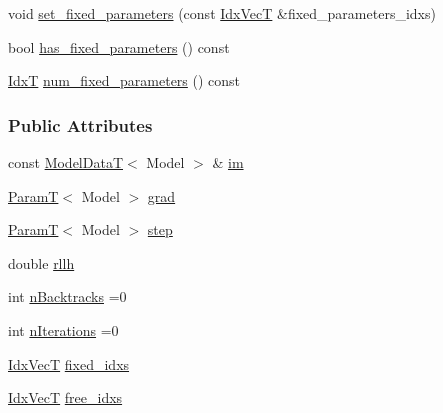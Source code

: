 \begin{DoxyCompactItemize}
void \hyperlink{classmappel_1_1estimator_1_1IterativeMaximizer_1_1MaximizerData_a0094ff8afeec02cd89b65c6e2e55adcb}{set\+\_\+fixed\+\_\+parameters} (const \hyperlink{namespacemappel_ac63743dcd42180127307cd0e4ecdd784}{Idx\+VecT} \&fixed\+\_\+parameters\+\_\+idxs)
\item 
bool \hyperlink{classmappel_1_1estimator_1_1IterativeMaximizer_1_1MaximizerData_a3c8ca53ca10c86795555b9e8da8c7be7}{has\+\_\+fixed\+\_\+parameters} () const 
\item 
\hyperlink{namespacemappel_ab17ec0f30b61ece292439d7ece81d3a8}{IdxT} \hyperlink{classmappel_1_1estimator_1_1IterativeMaximizer_1_1MaximizerData_a0b817c4ce7684bbf0aac25c2a7e55c63}{num\+\_\+fixed\+\_\+parameters} () const 
\end{DoxyCompactItemize}
\subsubsection*{Public Attributes}
\begin{DoxyCompactItemize}
\item 
const \hyperlink{namespacemappel_a97f050df953605381ae9c901c3b125f1}{Model\+DataT}$<$ Model $>$ \& \hyperlink{classmappel_1_1estimator_1_1IterativeMaximizer_1_1MaximizerData_a01a762941a06e7f6839817971674c354}{im}
\item 
\hyperlink{namespacemappel_a667925cb0d6c0e49f2f035cc5a9a6857}{ParamT}$<$ Model $>$ \hyperlink{classmappel_1_1estimator_1_1IterativeMaximizer_1_1MaximizerData_a7a71e71e379159ee30914e0539196c71}{grad}
\item 
\hyperlink{namespacemappel_a667925cb0d6c0e49f2f035cc5a9a6857}{ParamT}$<$ Model $>$ \hyperlink{classmappel_1_1estimator_1_1IterativeMaximizer_1_1MaximizerData_abca4cc72bc3cbf7326c5d4ad040e3821}{step}
\item 
double \hyperlink{classmappel_1_1estimator_1_1IterativeMaximizer_1_1MaximizerData_a8df6de6efff1eab16147e3ab42f98469}{rllh}
\item 
int \hyperlink{classmappel_1_1estimator_1_1IterativeMaximizer_1_1MaximizerData_a38c5825b8f0de1132858b23457c79fa7}{n\+Backtracks} =0
\item 
int \hyperlink{classmappel_1_1estimator_1_1IterativeMaximizer_1_1MaximizerData_af335e6189ff196756aac6fd9b4bc53e0}{n\+Iterations} =0
\item 
\hyperlink{namespacemappel_ac63743dcd42180127307cd0e4ecdd784}{Idx\+VecT} \hyperlink{classmappel_1_1estimator_1_1IterativeMaximizer_1_1MaximizerData_abb0d471c64f4f29335972f119efb6ef8}{fixed\+\_\+idxs}
\item 
\hyperlink{namespacemappel_ac63743dcd42180127307cd0e4ecdd784}{Idx\+VecT} \hyperlink{classmappel_1_1estimator_1_1IterativeMaximizer_1_1MaximizerData_a96fb9ed6b5c603ab2380b9dd24723bca}{free\+\_\+idxs}
\end{DoxyCompactItemize}
